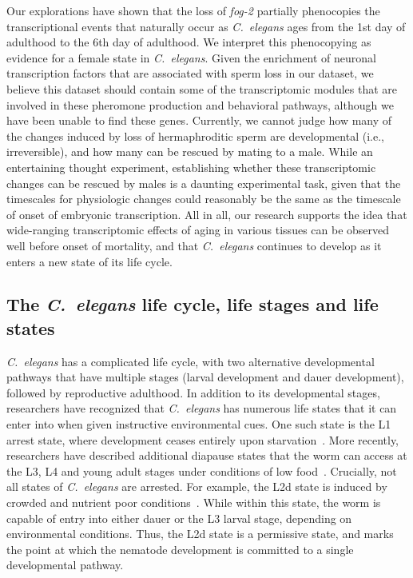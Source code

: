 \documentclass[10pt,letterpaper,twocolumn]{article}
\newcommand{\cel}{\emph{C.~elegans}}
\newcommand{\fog}{\emph{\mbox{fog-2}}}
\begin{document}
Our explorations have shown that the loss of \fog{} partially phenocopies the transcriptional events that naturally occur as \cel{} ages from the 1st day of adulthood to the 6th day of adulthood. We interpret this phenocopying as evidence for a female state in \cel{}.
Given the enrichment of neuronal transcription factors that are associated with sperm loss in our dataset, we believe this dataset should contain some of the transcriptomic modules that are involved in these pheromone production and behavioral pathways, although we have been unable to find these genes. Currently, we cannot judge how many of the changes induced by loss of hermaphroditic sperm are developmental (i.e., irreversible), and how many can be rescued by mating to a male.
While an entertaining thought experiment, establishing whether these transcriptomic changes can be rescued by males is a daunting experimental task, given that the timescales for physiologic changes could reasonably be the same as the timescale of onset of embryonic transcription. All in all, our research supports the idea that wide-ranging transcriptomic effects of aging in various tissues can be observed well before onset of mortality,
and that \cel{} continues to develop as it enters a new state of its life cycle.

\subsection{The \cel{} life cycle, life stages and life states}

\cel{} has a complicated life cycle, with two alternative developmental pathways that have multiple stages (larval development and dauer development), followed by reproductive adulthood. In addition to its developmental stages, researchers have recognized that \cel{} has numerous life states that it can enter into when given instructive environmental cues. One such state is the L1 arrest state, where development ceases entirely upon starvation~\cite{Johnson1984}. More recently, researchers have described additional diapause states that the worm can access at the L3, L4 and young adult stages under conditions of low food~\cite{Angelo2009,Schindler2014}. Crucially, not all states of \cel{} are arrested.
For example, the L2d state is induced by crowded and nutrient poor conditions~\cite{Golden1984}. While within this state, the worm is capable of entry into either dauer or the L3 larval stage, depending on environmental conditions. Thus, the L2d state is a permissive state, and marks the point at which the nematode development is committed to a single developmental pathway.
\end{document}
